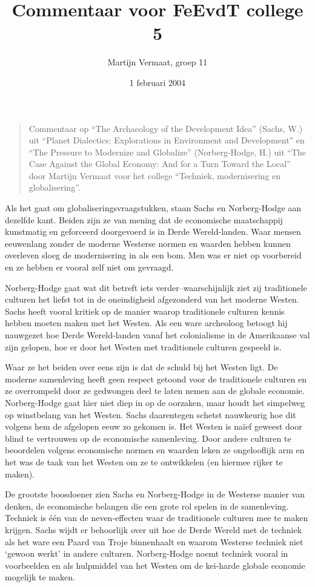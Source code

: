 \documentclass[11pt]{article}
\title{Commentaar voor FeEvdT college 5}
\author{
    Martijn Vermaat, groep 11
}
\date{1 februari 2004}
\begin{document}
\maketitle

\begin{quote}
Commentaar op ``The Archaeology of the Development Idea'' (Sachs, W.) uit ``Planet Dialectics: Explorations in Environment and Development'' en ``The Pressure to Modernize and Globalize'' (Norberg-Hodge, H.) uit ``The Case Against the Global Economy: And for a Turn Toward the Local'' door Martijn Vermaat voor het college ``Techniek, modernisering en globalisering''.
\end{quote}

Als het gaat om globaliseringsvraagstukken, staan Sachs en Norberg-Hodge aan dezelfde kant. Beiden zijn ze van mening dat de economische maatschappij kunstmatig en geforceerd doorgevoerd is in Derde Wereld-landen. Waar mensen eeuwenlang zonder de moderne Westerse normen en waarden hebben kunnen overleven sloeg de modernisering in als een bom. Men was er niet op voorbereid en ze hebben er vooral zelf niet om gevraagd.

Norberg-Hodge gaat wat dit betreft iets verder--waarschijnlijk ziet zij traditionele culturen het liefst tot in de oneindigheid afgezonderd van het moderne Westen. Sachs heeft vooral kritiek op de manier waarop traditionele culturen kennis hebben moeten maken met het Westen. Als een ware archeoloog betoogt hij nauwgezet hoe Derde Wereld-landen vanaf het colonialisme in de Amerikaanse val zijn gelopen, hoe er door het Westen met traditionele culturen gespeeld is.

Waar ze het beiden over eens zijn is dat de schuld bij het Westen ligt. De moderne samenleving heeft geen respect getoond voor de traditionele culturen en ze overrompeld door ze gedwongen deel te laten nemen aan de globale economie. Norberg-Hodge gaat hier niet diep in op de oorzaken, maar houdt het simpelweg op winstbelang van het Westen. Sachs daarentegen schetst nauwkeurig hoe dit volgens hem de afgelopen eeuw zo gekomen is. Het Westen is na\"ief geweest door blind te vertrouwen op de economische samenleving. Door andere culturen te beoordelen volgens economische normen en waarden leken ze ongelooflijk arm en het was de taak van het Westen om ze te ontwikkelen (en hiermee rijker te maken).

De grootste boosdoener zien Sachs en Norberg-Hodge in de Westerse manier van denken, de economische belangen die een grote rol spelen in de samenleving. Techniek is \'e\'en van de neven-effecten waar de traditionele culturen mee te maken krijgen. Sachs wijdt er behoorlijk over uit hoe de Derde Wereld met de techniek als het ware een Paard van Troje binnenhaalt en waarom Westerse techniek niet `gewoon werkt' in andere culturen. Norberg-Hodge noemt techniek vooral in voorbeelden en als hulpmiddel van het Westen om de kei-harde globale economie mogelijk te maken.
\end{document}
